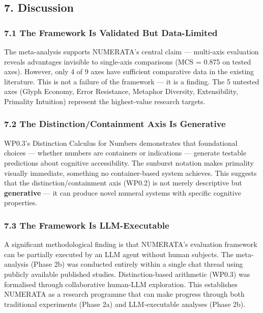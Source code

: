 \documentclass[
]{article}
\begin{document}
\subsection{7. Discussion}\label{discussion}

\subsubsection{7.1 The Framework Is Validated But
Data-Limited}\label{the-framework-is-validated-but-data-limited}

The meta-analysis supports NUMERATA's central claim --- multi-axis
evaluation reveals advantages invisible to single-axis comparisons (MCS
= 0.875 on tested axes). However, only 4 of 9 axes have sufficient
comparative data in the existing literature. This is not a failure of
the framework --- it is a finding. The 5 untested axes (Glyph Economy,
Error Resistance, Metaphor Diversity, Extensibility, Primality
Intuition) represent the highest-value research targets.

\subsubsection{7.2 The Distinction/Containment Axis Is
Generative}\label{the-distinctioncontainment-axis-is-generative}

WP0.3's Distinction Calculus for Numbers demonstrates that foundational
choices --- whether numbers are containers or indications --- generate
testable predictions about cognitive accessibility. The sunburst
notation makes primality visually immediate, something no
container-based system achieves. This suggests that the
distinction/containment axis (WP0.2) is not merely descriptive but
\textbf{generative} --- it can produce novel numeral systems with
specific cognitive properties.

\subsubsection{7.3 The Framework Is
LLM-Executable}\label{the-framework-is-llm-executable}

A significant methodological finding is that NUMERATA's evaluation
framework can be partially executed by an LLM agent without human
subjects. The meta-analysis (Phase 2b) was conducted entirely within a
single chat thread using publicly available published studies.
Distinction-based arithmetic (WP0.3) was formalised through
collaborative human-LLM exploration. This establishes NUMERATA as a
research programme that can make progress through both traditional
experiments (Phase 2a) and LLM-executable analyses (Phase 2b).
\end{document}
